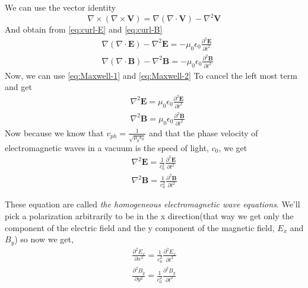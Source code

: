 \documentclass[english, a4paper, 12pt, twoside]{article}
\numberwithin{equation}{section} %
\begin{document}
We can use the vector identity
\begin{equation}
    \nabla \times \left( \nabla \times \mathbf{V} \right) = \nabla \left( \nabla \cdot \mathbf{V} \right) - \nabla^2 \mathbf{V}
\end{equation}
And obtain from \ref{eq:curl-E} and \ref{eq:curl-B}
\begin{subequations}
    \begin{align}
        &\nabla(\nabla \cdot \textbf{E}) - \nabla^2 \textbf{E} 
        = -\mu_0\epsilon_0\frac{\partial^2 \textbf{E}}{\partial t^2} \\
        &\nabla(\nabla \cdot \textbf{B}) - \nabla^2 \textbf{B} 
        = -\mu_0\epsilon_0\frac{\partial^2 \textbf{B}}{\partial t^2}
    \end{align}
\end{subequations}
Now, we can use \ref{eq:Maxwell-1} and \ref{eq:Maxwell-2} To cancel the left most term and get
\begin{subequations}
    \begin{align}
        &\nabla^2 \textbf{E} = \mu_0\epsilon_0\frac{\partial^2 \textbf{E}}{\partial t^2}\\
        &\nabla^2 \textbf{B} = \mu_0\epsilon_0\frac{\partial^2 \textbf{B}}{\partial t^2}
    \end{align}
\end{subequations}
Now because we know that $v_{ph} = \frac{1}{\sqrt{\mu_0\epsilon_0}}$ and that the phase velocity of electromagnetic waves in a vacuum is the speed of light, $c_0$, we get
\begin{equation} \label{eq:Homo_electro_wave}
    \begin{split}
        \nabla^2 \textbf{E} = \frac{1}{c_0^2}\frac{\partial^2 \textbf{E}}{\partial t^2} \\
        \nabla^2 \textbf{B} = \frac{1}{c_0^2}\frac{\partial^2 \textbf{B}}{\partial t^2}
    \end{split}
\end{equation}

These equation are called \textit{the homogeneous electromagnetic wave equations}.
We'll pick a polarization arbitrarily to be in the x direction(that way we get only the component of the electric field and the y component of the magnetic field, $E_x$ and $B_y$) so now we get,
\begin{equation} \label{eq:Homo_electro_wave_pol}
    \begin{split}
        \frac{\partial^2 E_x}{\partial x^2} = \frac{1}{c_0^2}\frac{\partial^2 E_x}{\partial t^2} \\
        \frac{\partial^2 B_y}{\partial y^2} = \frac{1}{c_0^2}\frac{\partial^2 B_y}{\partial t^2} 
    \end{split}
\end{equation}
\end{document}
